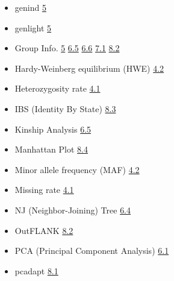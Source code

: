 \documentclass[
]{book}
\begin{document}
\begin{itemize}
\item
  genind \href{https://teddyenn.github.io/ShiNyP-guide/sec-data-conversion.html\#step-1-transform-data.frame-to-genind}{5}
\item
  genlight \href{https://teddyenn.github.io/ShiNyP-guide/sec-data-conversion.html\#step-2-transform-genind-to-genlight}{5}
\item
  Group Info. \href{https://teddyenn.github.io/ShiNyP-guide/sec-data-conversion.html\#step-1-transform-data.frame-to-genind}{5} \href{https://teddyenn.github.io/ShiNyP-guide/sec-population-structure.html\#kinship-analysis}{6.5} \href{https://teddyenn.github.io/ShiNyP-guide/sec-population-structure.html\#scatter-plot-plus}{6.6} \href{https://teddyenn.github.io/ShiNyP-guide/sec-genetic-diversity.html\#diversity-parameter}{7.1} \href{https://teddyenn.github.io/ShiNyP-guide/sec-selection-sweep.html\#outflank}{8.2}
\item
  Hardy-Weinberg equilibrium (HWE) \href{https://teddyenn.github.io/ShiNyP-guide/sec-data-qc.html\#snp-qc}{4.2}
\item
  Heterozygosity rate \href{https://teddyenn.github.io/ShiNyP-guide/sec-data-qc.html\#sample-qc}{4.1}
\item
  IBS (Identity By State) \href{https://teddyenn.github.io/ShiNyP-guide/sec-selection-sweep.html\#ibs-identity-by-state}{8.3}
\item
  Kinship Analysis \href{https://teddyenn.github.io/ShiNyP-guide/sec-population-structure.html\#kinship-analysis}{6.5}
\item
  Manhattan Plot \href{https://teddyenn.github.io/ShiNyP-guide/sec-selection-sweep.html\#manhattan-plot-plus}{8.4}
\item
  Minor allele frequency (MAF) \href{https://teddyenn.github.io/ShiNyP-guide/sec-data-qc.html\#snp-qc}{4.2}
\item
  Missing rate \href{https://teddyenn.github.io/ShiNyP-guide/sec-data-qc.html\#sample-qc}{4.1}
\item
  NJ (Neighbor-Joining) Tree \href{https://teddyenn.github.io/ShiNyP-guide/sec-population-structure.html\#nj-neighbor-joining-tree}{6.4}
\item
  OutFLANK \href{https://teddyenn.github.io/ShiNyP-guide/sec-selection-sweep.html\#outflank}{8.2}
\item
  PCA (Principal Component Analysis) \href{https://teddyenn.github.io/ShiNyP-guide/sec-population-structure.html\#pca-principal-component-analysis}{6.1}
\item
  pcadapt \href{https://teddyenn.github.io/ShiNyP-guide/sec-selection-sweep.html\#pcadapt}{8.1}

\end{itemize}
\end{document}

